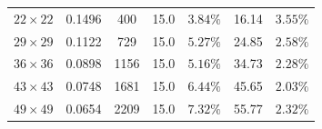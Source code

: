 \documentclass[preprint,12pt]{elsarticle}
\begin{document}
\begin{table}[!t]
{\begin{tabular}{ccccccc}
            $22 \times 22$            & 0.1496                                       & 400             & 15.0                                                                   & $3.84\%$                                                                                      & 16.14                              & $\mathbf{3.55\%}$                                    \\
            $29 \times 29$            & 0.1122                                       & 729             & 15.0                                                                   & $5.27\%$                                                                                      & 24.85                              & $\mathbf{2.58\%}$                                    \\
            $36 \times 36$            & 0.0898                                       & 1156            & 15.0                                                                   & $5.16\%$                                                                                      & 34.73                              & $\mathbf{2.28\%}$                                    \\
            $43 \times 43$            & 0.0748                                       & 1681            & 15.0                                                                   & $6.44\%$                                                                                      & 45.65                              & $\mathbf{2.03\%}$                                    \\
            $49 \times 49$            & 0.0654                                       & 2209            & 15.0                                                                   & $7.32\%$                                                                                      & 55.77                              & $\mathbf{2.32\%}$                                    \\
            \bottomrule
        \end{tabular}
    }
\end{table}
\end{document}
